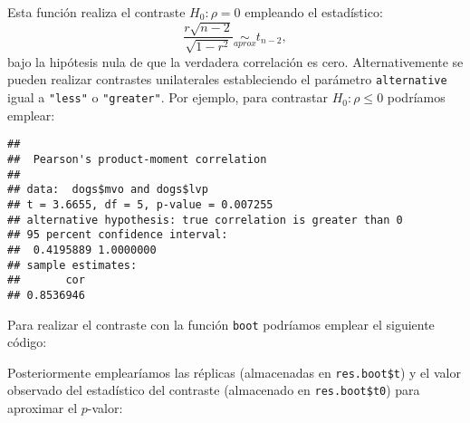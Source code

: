 \documentclass[
]{book}
\newenvironment{Shaded}{\begin{snugshade}}{\end{snugshade}}
\newcommand{\AttributeTok}[1]{\textcolor[rgb]{0.77,0.63,0.00}{#1}}
\newcommand{\CommentTok}[1]{\textcolor[rgb]{0.56,0.35,0.01}{\textit{#1}}}
\newcommand{\ControlFlowTok}[1]{\textcolor[rgb]{0.13,0.29,0.53}{\textbf{#1}}}
\newcommand{\DecValTok}[1]{\textcolor[rgb]{0.00,0.00,0.81}{#1}}
\newcommand{\FunctionTok}[1]{\textcolor[rgb]{0.00,0.00,0.00}{#1}}
\newcommand{\NormalTok}[1]{#1}
\newcommand{\OtherTok}[1]{\textcolor[rgb]{0.56,0.35,0.01}{#1}}
\newcommand{\SpecialCharTok}[1]{\textcolor[rgb]{0.00,0.00,0.00}{#1}}
\newcommand{\StringTok}[1]{\textcolor[rgb]{0.31,0.60,0.02}{#1}}
\theoremstyle{break}
\theoremstyle{definition}
\theoremstyle{definition}
\theoremstyle{definition}
\theoremstyle{definition}
\theoremstyle{remark}
\begin{document}
Esta función realiza el contraste \(H_0: \rho = 0\) empleando el estadístico:
\[\frac{r\sqrt{n - 2}}{\sqrt{1 - r^2}} \underset{aprox}{\sim } t_{n-2},\]
bajo la hipótesis nula de que la verdadera correlación es cero.
Alternativemente se pueden realizar contrastes unilaterales estableciendo
el parámetro \texttt{alternative} igual a \texttt{"less"} o \texttt{"greater"}.
Por ejemplo, para contrastar \(H_0: \rho \leq 0\) podríamos emplear:

\begin{Shaded}
\end{Shaded}

\begin{verbatim}
## 
##  Pearson's product-moment correlation
## 
## data:  dogs$mvo and dogs$lvp
## t = 3.6655, df = 5, p-value = 0.007255
## alternative hypothesis: true correlation is greater than 0
## 95 percent confidence interval:
##  0.4195889 1.0000000
## sample estimates:
##       cor 
## 0.8536946
\end{verbatim}

Para realizar el contraste con la función \texttt{boot} podríamos
emplear el siguiente código:

\begin{Shaded}
\end{Shaded}

Posteriormente emplearíamos las réplicas (almacenadas en \texttt{res.boot\$t}) y el valor
observado del estadístico del contraste (almacenado en \texttt{res.boot\$t0})
para aproximar el \(p\)-valor:
\end{document}
